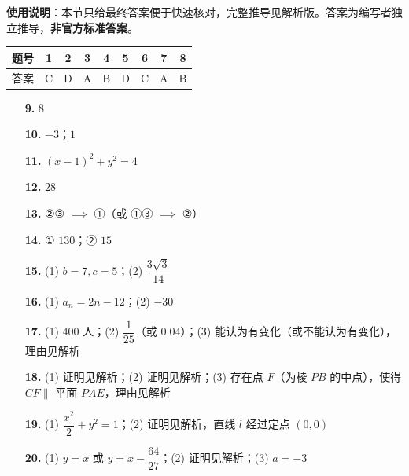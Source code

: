 
\begin{gknotice}
\textbf{使用说明}：本节只给最终答案便于快速核对，完整推导见解析版。答案为编写者独立推导，\textbf{非官方标准答案}。
\end{gknotice}

\begin{center}\begin{tabular}{ccccccccc}
\toprule
题号 & 1 & 2 & 3 & 4 & 5 & 6 & 7 & 8 \\
\midrule
答案 & C & D & A & B & D & C & A & B \\
\bottomrule
\end{tabular}\end{center}

\begin{itemize}[leftmargin=2.6em]
  \item[\textbf{9.}] $8$
  \item[\textbf{10.}] $-3$；$1$
  \item[\textbf{11.}] $(x - 1)^2 + y^2 = 4$
  \item[\textbf{12.}] $28$
  \item[\textbf{13.}] ②③ $\implies$ ①（或 ①③ $\implies$ ②）
  \item[\textbf{14.}] ① $130$；② $15$
\end{itemize}

\begin{itemize}[leftmargin=2.6em]
  \item[\textbf{15.}] (1) $b = 7, c = 5$；(2) $\dfrac{3\sqrt{3}}{14}$
  \item[\textbf{16.}] (1) $a_n = 2n - 12$；(2) $-30$
  \item[\textbf{17.}] (1) $400$ 人；(2) $\dfrac{1}{25}$（或 $0.04$）；(3) 能认为有变化（或不能认为有变化），理由见解析
  \item[\textbf{18.}] (1) 证明见解析；(2) 证明见解析；(3) 存在点 $F$（为棱 $PB$ 的中点），使得 $CF \parallel$ 平面 $PAE$，理由见解析
  \item[\textbf{19.}] (1) $\dfrac{x^2}{2} + y^2 = 1$；(2) 证明见解析，直线 $l$ 经过定点 $(0, 0)$
  \item[\textbf{20.}] (1) $y = x$ 或 $y = x - \dfrac{64}{27}$；(2) 证明见解析；(3) $a = -3$
\end{itemize}
